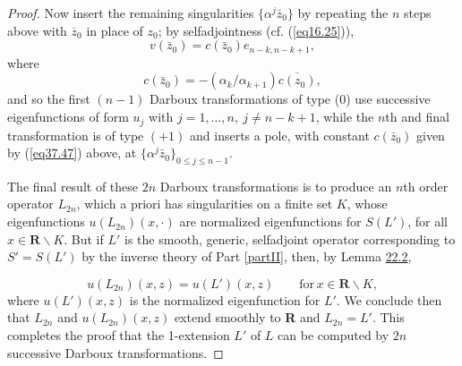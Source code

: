 \documentclass{surv-l}
\theoremstyle{plain}
\theoremstyle{definition}
\numberwithin{equation}{chapter}
\begin{document}
\begin{proof}
Now insert the remaining singularities $\{\alpha^{j}\bar{z}_{0}\}$ by repeating the $n$ steps above with $\overline{z}_{0}$ in place of $z_{0}$; by selfadjointness (cf. (\ref{eq16.25})),
\begin{equation}\label{eq37.46}
v(\bar{z}_{0})=c(\bar{z}_{0})e_{n-k,n-k+1},
\end{equation}
where
\begin{equation}\label{eq37.47}
c(\bar{z}_{0})=-(\alpha_{k}/\alpha_{k+1})\overline{c(z_{0})},
\end{equation}
and so the first $(n-1)$ Darboux transformations of type (0) use successive eigenfunctions of form $u_{j}$ with $j=1,\ldots,n,\ j\neq n-k+1$, while the $n$th and final transformation is of type $(+1)$ and inserts a pole, with constant $c(\bar{z}_{0})$ given by (\ref{eq37.47}) above, at $\{\alpha^{j}\bar{z}_{0}\}_{0\leq j\leq n-1}$.

The final result of these $2n$ Darboux transformations is to produce an $n$th order operator $L_{2n}$, which a priori has singularities on a finite set $K$, whose eigenfunctions $u(L_{2n})(x,\cdot)$ are normalized eigenfunctions for $S(L')$, for all $ x\in \textbf{R}\backslash K$. But if $L'$ is the smooth, generic, selfadjoint operator corresponding to $S'=S(L')$ by the inverse theory of Part \ref{partII}, then, by Lemma \hyperref[lem22.2]{22.2},

\begin{equation*}
u(L_{2n})(x,z)=u(L') (x,z) \qquad \mathrm{ for}\, x\in \textbf{R}\backslash K,
\end{equation*}
where $u(L') (x, z)$ is the normalized eigenfunction for $L'$. We conclude then that $L_{2n}$ and $u(L_{2n})(x, z)$ extend smoothly to \textbf{R} and $L_{2n}=L'$. This completes the proof that the 1-extension $L'$ of $L$ can be computed by $2n$ successive Darboux transformations.


\end{proof}
\end{document}

